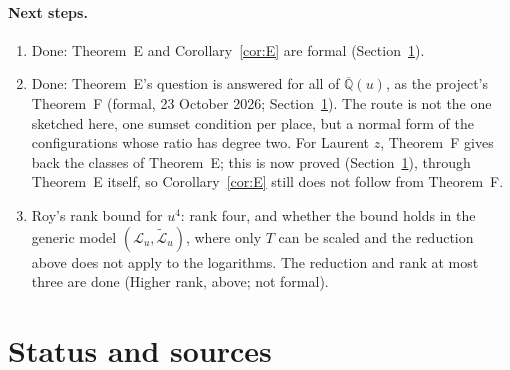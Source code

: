 \documentclass[11pt,a4paper]{article}
\theoremstyle{plain}
\theoremstyle{definition}
\newcommand{\Qbar}{\overline{\mathbb{Q}}}
\newcommand{\cL}{\mathcal{L}}
\newcommand{\Lt}{\widetilde{\mathcal{L}}}
\begin{document}
\paragraph{Next steps.}
\begin{enumerate}[label=\textup{(\arabic*)}]
\item Done: Theorem~E and Corollary~\ref{cor:E} are formal (Section~\ref{sec:status}).
\item Done: Theorem~E's question is answered for all of $\Qbar(u)$, as the project's Theorem~F (formal,
23 October 2026; Section~\ref{sec:status}). The route is not the one sketched here, one sumset condition per
place, but a normal form of the configurations whose ratio has degree two. For Laurent $z$, Theorem~F gives back
the classes of Theorem~E; this is now proved (Section~\ref{sec:status}), through Theorem~E itself, so
Corollary~\ref{cor:E} still does not follow from Theorem~F.
\item Roy's rank bound for $u^{4}$: rank four, and whether the bound holds in the generic model
$(\cL_{u},\Lt_{u})$, where only $T$ can be scaled and the reduction above does not apply to the
logarithms. The reduction and rank at most three are done (Higher rank, above; not formal).
\end{enumerate}

\section{Status and sources}\label{sec:status}
\end{document}
